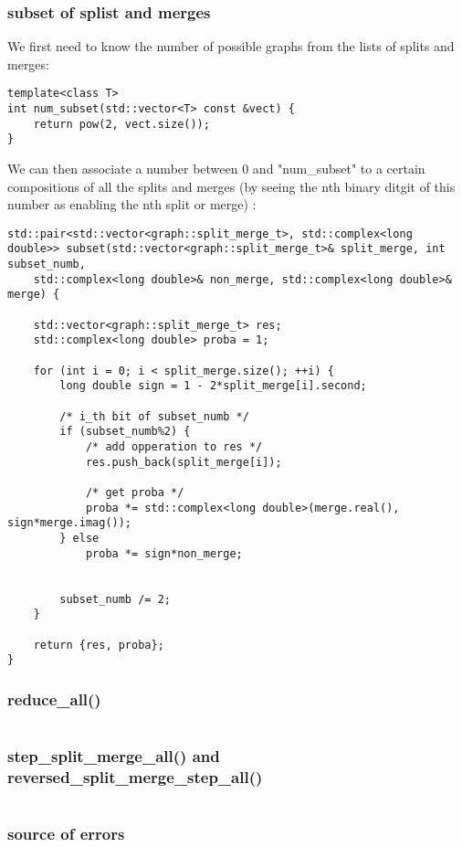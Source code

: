 \documentclass[11pt]{article}
\begin{document}
\subsubsection{subset of splist and merges}

We first need to know the number of possible graphs from the lists of splits and merges:

\begin{lstlisting}[style=CStyle]
template<class T>
int num_subset(std::vector<T> const &vect) {
	return pow(2, vect.size());
}
\end{lstlisting}

We can then associate a number between 0 and "num\_subset" to a certain compositions of all the splits and merges (by seeing the nth binary ditgit of this number as enabling the nth split or merge) :

\begin{lstlisting}[style=CStyle]
std::pair<std::vector<graph::split_merge_t>, std::complex<long double>> subset(std::vector<graph::split_merge_t>& split_merge, int subset_numb,
	std::complex<long double>& non_merge, std::complex<long double>& merge) {
	
	std::vector<graph::split_merge_t> res;
	std::complex<long double> proba = 1;

	for (int i = 0; i < split_merge.size(); ++i) {
		long double sign = 1 - 2*split_merge[i].second;

		/* i_th bit of subset_numb */
		if (subset_numb%2) {
			/* add opperation to res */
			res.push_back(split_merge[i]);

			/* get proba */
			proba *= std::complex<long double>(merge.real(), sign*merge.imag());
		} else
			proba *= sign*non_merge;


		subset_numb /= 2;
	}

	return {res, proba};
}
\end{lstlisting}

\subsubsection{reduce\_all()}

\begin{lstlisting}[style=CStyle]
\end{lstlisting}

\subsubsection{step\_split\_merge\_all() and reversed\_split\_merge\_step\_all()}

\begin{lstlisting}[style=CStyle]
\end{lstlisting}

\subsubsection{source of errors}
\end{document}
